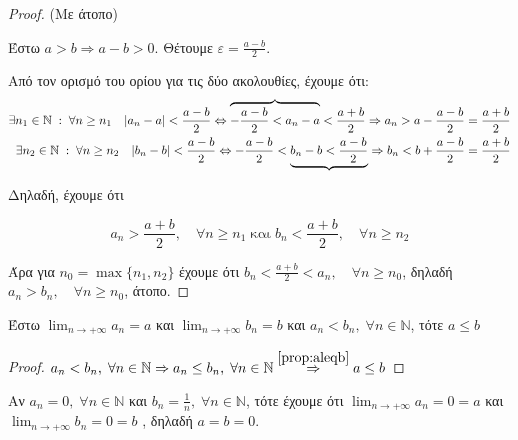 \begin{proof}(Με άτοπο)
\item {}
  Έστω $ a>b \Rightarrow a-b>0 $. Θέτουμε $ \varepsilon = 
  \frac{a-b}{2} $.

  Από τον ορισμό του ορίου για τις δύο ακολουθίες, έχουμε ότι:
  \begin{align*}
    \exists n_{1} \in \mathbb{N} \; : \; \forall n \geq n_{1} 
    \quad \abs{a_{n}-a} < \frac{a-b}{2} \Leftrightarrow 
    \overbrace{- \frac{a-b}{2} < a_{n} - a} < \frac{a+b}{2} \Rightarrow a_{n} > a -
    \frac{a-b}{2} = \frac{a+b}{2} \\
    \exists n_{2} \in \mathbb{N} \; : \; \forall n \geq n_{2} 
    \quad \abs{b_{n}-b} < \frac{a-b}{2} \Leftrightarrow 
    - \frac{a-b}{2} < \underbrace{b_{n} - b < \frac{a-b}{2}} \Rightarrow b_{n} < b +
    \frac{a-b}{2} = \frac{a+b}{2} 
  \end{align*}

  Δηλαδή, έχουμε ότι

  \[ a_{n} >  \frac{a+b}{2}, \quad \forall n \geq n_{1} \; \text{και} \;  
  b_{n} <  \frac{a+b}{2}, \quad \forall n \geq n_{2}  \]

  Άρα για $ n_{0} = \max \{ n_{1}, n_{2} \} $ έχουμε ότι 
  $ b_{n} < \frac{a+b}{2} < a_{n}, \quad \forall n \geq n_{0} $, 
  δηλαδή $a_{n} > b_{n}, \quad \forall n \geq n_{0} $, άτοπο.
\end{proof}

\begin{mybox3}
  \begin{prop}
    Έστω $ \lim_{n \to +\infty} a_{n} = a $ και $ \lim_{n \to +\infty} 
    b_{n} = b $ και 
    $ a_{n} < b_{n}, \; \forall n \in \mathbb{N} $, τότε $ a \leq b $ 
  \end{prop}
\end{mybox3}

\begin{proof}
  $ a_{n}< b_{n}, \; \forall n \in \mathbb{N} \Rightarrow a_{n} \leq 
  b_{n}, \; \forall n \in \mathbb{N} \overset{\ref{prop:aleqb}}{\Rightarrow} 
  a \leq b $
\end{proof}

\begin{example}
\item {}
  Αν $ a_{n}=0, \; \forall n \in \mathbb{N} $
  και $ b_{n}= \frac{1}{n}, \; \forall n \in \mathbb{N} $, τότε έχουμε ότι 
  $ \lim_{n \to +\infty} a_{n} = 0 = a $ και 
  $ \lim_{n \to +\infty} b_{n} =  0 = b $ , δηλαδή $ a=b=0  $.
\end{example}

